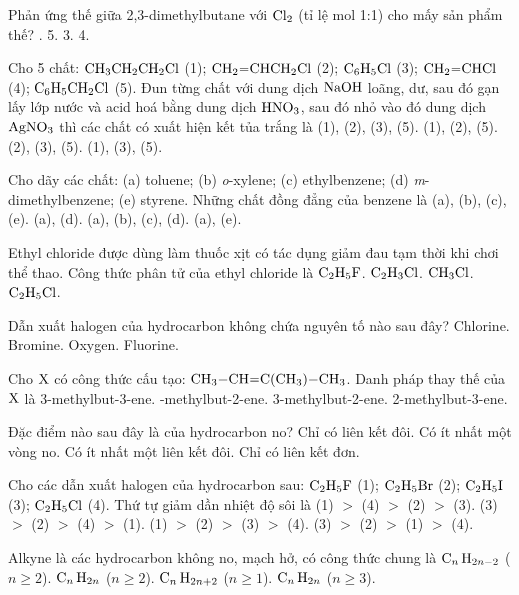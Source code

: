 \documentclass[11pt,a4paper]{article}
\begin{document}
\begin{ex}
Phản ứng thế giữa 2,3-dimethylbutane với $\ce{Cl2}$ (tỉ lệ mol 1:1) cho mấy sản phẩm thế?
\choice
{.}
{5.}
{3.}
{4.}
\end{ex}
\begin{ex}
Cho 5 chất: $\ce{CH3CH2CH2Cl}$ (1); $\ce{CH2=CHCH2Cl}$ (2); $\ce{C6H5Cl}$ (3); $\ce{CH2=CHCl}$ (4); $\ce{C6H5CH2Cl}$ (5). Đun từng chất với dung dịch $\ce{NaOH}$ loãng, dư, sau đó gạn lấy lớp nước và acid hoá bằng dung dịch $\ce{HNO3}$, sau đó nhỏ vào đó dung dịch $\ce{AgNO3}$ thì các chất có xuất hiện kết tủa trắng là
\choice
{(1), (2), (3), (5).}
{\True (1), (2), (5).}
{(2), (3), (5).}
{(1), (3), (5).}
\end{ex}
\begin{ex}
Cho dãy các chất: (a) toluene; (b) \textit{o}-xylene; (c) ethylbenzene; (d) \textit{m}-dimethylbenzene; (e) styrene. Những chất đồng đẳng của benzene là
\choice
{(a), (b), (c), (e).}
{(a), (d).}
{\True (a), (b), (c), (d).}
{(a), (e).}
\end{ex}
\begin{ex}
Ethyl chloride được dùng làm thuốc xịt có tác dụng giảm đau tạm thời khi chơi thể thao. Công thức phân tử của ethyl chloride là
\choice
{$\ce{C2H5F}$.}
{$\ce{C2H3Cl}$.}
{$\ce{CH3Cl}$.}
{\True $\ce{C2H5Cl}$.}
\end{ex}
\begin{ex}
Dẫn xuất halogen của hydrocarbon không chứa nguyên tố nào sau đây?
\choice
{Chlorine.}
{Bromine.}
{\True Oxygen.}
{Fluorine.}
\end{ex}
\begin{ex}
Cho $\ce{X}$ có công thức cấu tạo: $\ce{CH3-CH=C(CH3)-CH3}$. Danh pháp thay thế của $\ce{X}$ là
\choice
{3-methylbut-3-ene.}
{-methylbut-2-ene.}
{3-methylbut-2-ene.}
{2-methylbut-3-ene.}
\end{ex}
\begin{ex}
Đặc điểm nào sau đây là của hydrocarbon no?
\choice
{Chỉ có liên kết đôi.}
{Có ít nhất một vòng no.}
{Có ít nhất một liên kết đôi.}
{\True Chỉ có liên kết đơn.}
\end{ex}
\begin{ex}
Cho các dẫn xuất halogen của hydrocarbon sau: $\ce{C2H5F}$ (1); $\ce{C2H5Br}$ (2); $\ce{C2H5I}$ (3); $\ce{C2H5Cl}$ (4). Thứ tự giảm dần nhiệt độ sôi là
\choice
{(1) $>$ (4) $>$ (2) $>$ (3).}
{\True (3) $>$ (2) $>$ (4) $>$ (1).}
{(1) $>$ (2) $>$ (3) $>$ (4).}
{(3) $>$ (2) $>$ (1) $>$ (4).}
\end{ex}
\begin{ex}
Alkyne là các hydrocarbon không no, mạch hở, có công thức chung là
\choice
{\True $\ce{C_n H_{2n-2}}$ ($n \ge 2$).}
{$\ce{C_n H_{2n}}$ ($n \ge 2$).}
{$\ce{C_n H_{2n+2}}$ ($n \ge 1$).}
{$\ce{C_n H_{2n}}$ ($n \ge 3$).}
\end{ex}
\end{document}
